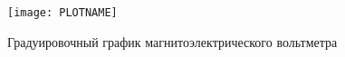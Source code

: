 \begin{figure}[hb!]
    \begin{center}
        \texttt{[image: PLOTNAME]}
    \end{center}
    \caption{Градуировочный график магнитоэлектрического вольтметра}
    \label{fig:PLOTNAME}
\end{figure}
